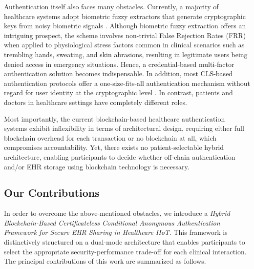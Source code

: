 \documentclass[conference]{IEEEtran}
\begin{document}
Authentication itself also faces many obstacles. Currently, a majority of healthcare systems adopt biometric fuzzy extractors that generate cryptographic keys from noisy biometric signals \cite{ref16}. Although biometric fuzzy extraction offers an intriguing prospect, the scheme involves non-trivial False Rejection Rates (FRR) when applied to physiological stress factors common in clinical scenarios such as trembling hands, sweating, and skin abrasions, resulting in legitimate users being denied access in emergency situations. Hence, a credential-based multi-factor authentication solution becomes indispensable. In addition, most CLS-based authentication protocols offer a one-size-fits-all authentication mechanism without regard for user identity at the cryptographic level \cite{ref17}. In contrast, patients and doctors in healthcare settings have completely different roles.

Most importantly, the current blockchain-based healthcare authentication systems exhibit inflexibility in terms of architectural design, requiring either full blockchain overhead for each transaction or no blockchain at all, which compromises accountability. Yet, there exists no patient-selectable hybrid architecture, enabling participants to decide whether off-chain authentication and/or EHR storage using blockchain technology is necessary.

\subsection{Our Contributions}

In order to overcome the above-mentioned obstacles, we introduce a \textit{Hybrid Blockchain-Based Certificateless Conditional Anonymous Authentication Framework for Secure EHR Sharing in Healthcare IIoT}. This framework is distinctively structured on a dual-mode architecture that enables participants to select the appropriate security-performance trade-off for each clinical interaction. The principal contributions of this work are summarized as follows.
\end{document}
